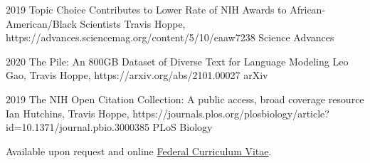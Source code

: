 \documentclass[]{scrartcl}
\begin{document}
\begin{cleanCV}
\Paper
{2019}
{Topic Choice Contributes to Lower Rate of NIH Awards to African-American/Black Scientists}
{Travis Hoppe, \etal}
{https://advances.sciencemag.org/content/5/10/eaaw7238}
{Science Advances}

\Paper
{2020}
{The Pile: An 800GB Dataset of Diverse Text for Language Modeling}
{Leo Gao, Travis Hoppe, \etal}
{https://arxiv.org/abs/2101.00027}
{arXiv}

\Paper
{2019}
{The NIH Open Citation Collection: A public access, broad coverage resource}
{Ian Hutchins, Travis Hoppe, \etal}
{https://journals.plos.org/plosbiology/article?id=10.1371/journal.pbio.3000385}
{PLoS Biology}





Available upon request and online \href{https://github.com/thoppe/personal_cv/blob/master/tex/pdf/Travis_Hoppe_Federal_Resume.pdf?raw=true}{Federal Curriculum Vitae}.


\end{cleanCV}
\end{document}
